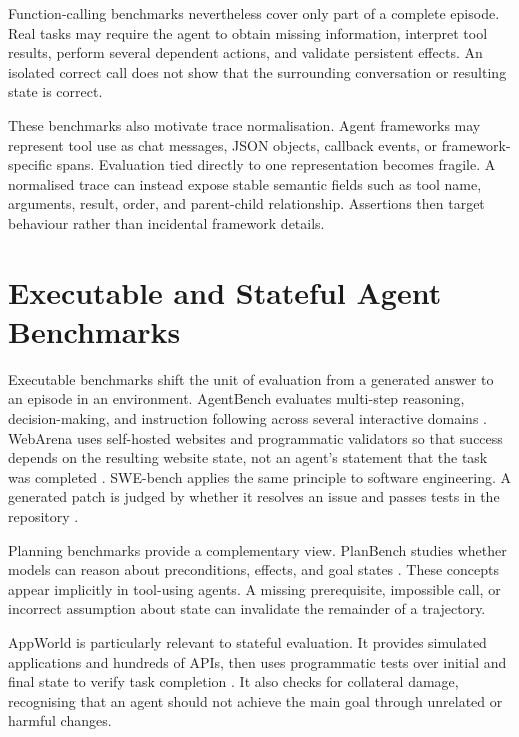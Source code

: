 Function-calling benchmarks nevertheless cover only part of a complete episode. Real tasks may require the agent to obtain missing information, interpret tool results, perform several dependent actions, and validate persistent effects. An isolated correct call does not show that the surrounding conversation or resulting state is correct.

These benchmarks also motivate trace normalisation. Agent frameworks may represent tool use as chat messages, JSON objects, callback events, or framework-specific spans. Evaluation tied directly to one representation becomes fragile. A normalised trace can instead expose stable semantic fields such as tool name, arguments, result, order, and parent-child relationship. Assertions then target behaviour rather than incidental framework details.

\section{Executable and Stateful Agent Benchmarks}
\label{sec:bg-stateful-benchmarks}

Executable benchmarks shift the unit of evaluation from a generated answer to an episode in an environment. AgentBench evaluates multi-step reasoning, decision-making, and instruction following across several interactive domains \citep{liu2023agentbench}. WebArena uses self-hosted websites and programmatic validators so that success depends on the resulting website state, not an agent's statement that the task was completed \citep{zhou2023webarena}. SWE-bench applies the same principle to software engineering. A generated patch is judged by whether it resolves an issue and passes tests in the repository \citep{jimenez2024swebench}.

Planning benchmarks provide a complementary view. PlanBench studies whether models can reason about preconditions, effects, and goal states \citep{valmeekam2023planbench}. These concepts appear implicitly in tool-using agents. A missing prerequisite, impossible call, or incorrect assumption about state can invalidate the remainder of a trajectory.

AppWorld is particularly relevant to stateful evaluation. It provides simulated applications and hundreds of APIs, then uses programmatic tests over initial and final state to verify task completion \citep{trivedi2024appworld}. It also checks for collateral damage, recognising that an agent should not achieve the main goal through unrelated or harmful changes.


